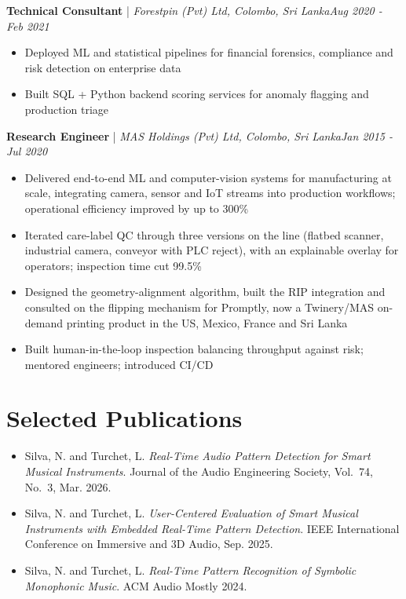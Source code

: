 \documentclass[11pt]{article}
\newenvironment{cvrole}[5]{%
  \par\noindent\textbf{\large #1} | \textit{\small #2, #3}\hfill \textit{\small #4 - #5}\par
  \begin{itemize}[leftmargin=2em, itemsep=-0.3em, topsep=-0.5em]%
}{%
  \end{itemize}\par\noindent\mbox{}\par\vspace{0.1em}%
}
\begin{document}
\begin{cvrole}{Technical Consultant}{Forestpin (Pvt) Ltd}{Colombo, Sri Lanka}{Aug 2020}{Feb 2021}
    \item Deployed ML and statistical pipelines for financial forensics, compliance and risk detection on enterprise data
    \item Built SQL + Python backend scoring services for anomaly flagging and production triage
\end{cvrole}

\begin{cvrole}{Research Engineer}{MAS Holdings (Pvt) Ltd}{Colombo, Sri Lanka}{Jan 2015}{Jul 2020}
    \item Delivered end-to-end ML and computer-vision systems for manufacturing at scale, integrating camera, sensor and IoT streams into production workflows; operational efficiency improved by up to 300\%
    \item Iterated care-label QC through three versions on the line (flatbed scanner, industrial camera, conveyor with PLC reject), with an explainable overlay for operators; inspection time cut 99.5\%
    \item Designed the geometry-alignment algorithm, built the RIP integration and consulted on the flipping mechanism for Promptly, now a Twinery/MAS on-demand printing product in the US, Mexico, France and Sri Lanka
    \item Built human-in-the-loop inspection balancing throughput against risk; mentored engineers; introduced CI/CD
\end{cvrole}

\section*{Selected Publications \footnotesize {}}
\begin{itemize}[leftmargin=1.2em, itemsep=-0.25em]
    \item Silva, N. and Turchet, L. \textit{Real-Time Audio Pattern Detection for Smart Musical Instruments}. Journal of the Audio Engineering Society, Vol.~74, No.~3, Mar. 2026.
    \item Silva, N. and Turchet, L. \textit{User-Centered Evaluation of Smart Musical Instruments with Embedded Real-Time Pattern Detection}. IEEE International Conference on Immersive and 3D Audio, Sep. 2025.
    \item Silva, N. and Turchet, L. \textit{Real-Time Pattern Recognition of Symbolic Monophonic Music}. ACM Audio Mostly 2024.
\end{itemize}
\end{document}
